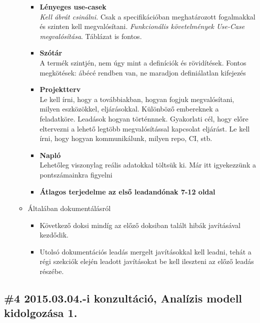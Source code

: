 \documentclass{article}
\begin{document}
\begin{itemize}
\begin{itemize}
\begin{itemize}
				\item \textbf{Lényeges use-casek}\\ 
				\emph{Kell ábrát csinálni.} Csak a specifikációban meghatározott fogalmakkal és szinten kell megvalósítani. \emph{Funkcionális követelmények Use-Case megvalósítása}. Táblázat is fontos.
				\item \textbf{Szótár}\\
				A termék szintjén, nem úgy mint a definíciók és rövidítések. Fontos megkötések: ábécé rendben van, ne maradjon definiálatlan kifejezés
				\item \textbf{Projektterv}\\
				 Le kell írni, hogy a továbbiakban, hogyan fogjuk megvalósítani, milyen eszközökkel, eljárásokkal. Különböző embereknek a feladatköre. Leadások hogyan történnnek. Gyakorlati cél, hogy előre eltervezni a lehető legtöbb megvalósítással kapcsolat eljárást. Le kell írni, hogy hogyan kommunikálunk, milyen repo, CI, stb.
				\item \textbf{Napló}\\
				Lehetőleg viszonylag reális adatokkal töltsük ki. Már itt igyekezzünk a pontszámainkra figyelni
				\item \textbf{Átlagos terjedelme az első leadandónak 7-12 oldal}
			\end{itemize}
			\item Általában dokumentálásról
			\begin{itemize}
				\item Következő doksi mindíg az előző doksiban talált hibák javításával kezdődik.
				\item Utolsó dokumentációs leadás mergelt javításokkal kell leadni, tehát a régi szekciók elején leadott javításokat be kell ileszteni az előző leadás részébe.
			\end{itemize}
		\end{itemize}
\end{itemize}

\subsection{\#4 2015.03.04.-i konzultáció, Analízis modell kidolgozása 1.}
\end{document}
